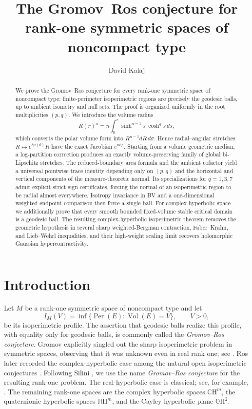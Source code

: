\documentclass[11pt,reqno]{amsart}
\title[Gromov--Ros conjecture in rank-one symmetric spaces]{The Gromov--Ros conjecture for rank-one symmetric spaces of noncompact type}
\author{David Kalaj}
\date{}
\numberwithin{equation}{section}
\theoremstyle{definition}
\theoremstyle{remark}
\newcommand{\CH}{\mathbb{C}\mathrm{H}}
\newcommand{\HH}{\mathbb{H}\mathrm{H}}
\newcommand{\OH}{\mathbb{O}\mathrm{H}}
\newcommand{\Vol}{\operatorname{Vol}}
\newcommand{\Per}{\operatorname{Per}}
\begin{document}
\begin{abstract}
We prove the Gromov--Ros conjecture for every rank-one symmetric space of
noncompact type: finite-perimeter isoperimetric regions are precisely the
geodesic balls, up to ambient isometry and null sets.  The proof is organized
uniformly in the root multiplicities $(p,q)$.  We introduce the volume radius
\[
 R(r)^n=n\int_0^r\sinh^{n-1}s\,\cosh^q s\,ds,
\]
which converts the polar volume form into
$R^{n-1}dR\,d\sigma$.  Hence radial--angular stretches
$R\mapsto e^{t\varphi(\theta)}R$ have the exact Jacobian
$e^{nt\varphi}$.  Starting from a volume geometric median, a log-partition
correction produces an exactly volume-preserving family of global
bi-Lipschitz stretches.  The reduced-boundary area formula and the ambient
cofactor yield a universal pointwise trace identity depending only on
$(p,q)$ and the horizontal and vertical components of the
measure-theoretic normal.  Its specializations for $q=1,3,7$ admit explicit
strict sign certificates, forcing the normal of an isoperimetric region to
be radial almost everywhere.  Isotropy invariance in BV and a
one-dimensional weighted endpoint comparison then force a single ball.
For complex hyperbolic space we additionally prove that every smooth bounded
fixed-volume stable critical domain is a geodesic ball.  The resulting
complex-hyperbolic isoperimetric theorem removes the geometric hypothesis in
several sharp weighted-Bergman contraction, Faber--Krahn, and Lieb--Wehrl
inequalities, and their high-weight scaling limit recovers holomorphic
Gaussian hypercontractivity.
\end{abstract}

\maketitle




\section{Introduction}

Let $M$ be a rank-one symmetric space of noncompact type and let
\[
 I_M(V)=\inf\{\Per(E):\Vol(E)=V\},\qquad V>0,
\]
be its isoperimetric profile.  The assertion that geodesic balls realize this profile, with equality only
for geodesic balls, is commonly called the \emph{Gromov--Ros conjecture}.
Gromov explicitly singled out the sharp isoperimetric problem in symmetric
spaces, observing that it was unknown even in real rank one; see
\cite[\S6.28(1/2+), pp.~331--332]{GromovMetricStructures}.
Ros later recorded the complex-hyperbolic case among the natural open
isoperimetric conjectures \cite[p.~177]{Ros2005}.
Following Silini \cite[p.~24]{SiliniThesis2024}, we use the name
\emph{Gromov--Ros conjecture} for the resulting rank-one problem. The real-hyperbolic
case is classical; see, for example, \cite{Ros2005,Ritore2023}.  The remaining
rank-one spaces are the complex hyperbolic spaces $\CH^m$, the quaternionic
hyperbolic spaces $\HH^m$, and the Cayley hyperbolic plane $\OH^2$.
\end{document}
